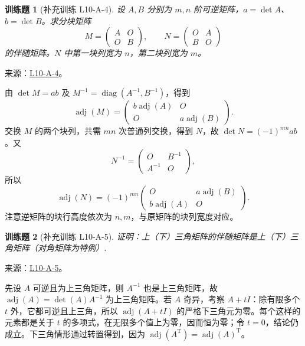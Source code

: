 \documentclass[UTF8,12pt,a4paper,fontset=fandol]{ctexart}
\newtheorem{exercise}{训练题}[section]
\begin{document}
\begin{exercise}[补充训练 L10-A-4]\label{prob:L10-A-4}
设 $A,B$ 分别为 $m,n$ 阶可逆矩阵，$a=\det A$、$b=\det B$。求分块矩阵
\[M=\begin{pmatrix}A&O\\O&B\end{pmatrix},\qquad N=\begin{pmatrix}O&A\\B&O\end{pmatrix}\]
的伴随矩阵。$N$ 中第一块列宽为 $n$，第二块列宽为 $m$。
\end{exercise}
\noindent 来源：\href{https://github.com/yhwu-is/Linear-Algebra-Left-Undone/blob/new/%E8%AE%B2%E4%B9%89/%E4%B8%93%E9%A2%98/10%20%E8%A1%8C%E5%88%97%E5%BC%8F.tex}{L10-A-4}。
\begin{solve}
由 $\det M=ab$ 及 $M^{-1}=\operatorname{diag}(A^{-1},B^{-1})$，得到
\[\operatorname{adj}(M)=\begin{pmatrix}b\operatorname{adj}(A)&O\\O&a\operatorname{adj}(B)\end{pmatrix}.\]
交换 $M$ 的两个块列，共需 $mn$ 次普通列交换，得到 $N$，故 $\det N=(-1)^{mn}ab$。又
\[N^{-1}=\begin{pmatrix}O&B^{-1}\\A^{-1}&O\end{pmatrix},\]
所以
\[\operatorname{adj}(N)=(-1)^{mn}\begin{pmatrix}O&a\operatorname{adj}(B)\\b\operatorname{adj}(A)&O\end{pmatrix}.\]
注意逆矩阵的块行高度依次为 $n,m$，与原矩阵的块列宽度对应。
\end{solve}

\begin{exercise}[补充训练 L10-A-5]\label{prob:L10-A-5}
证明：上（下）三角矩阵的伴随矩阵是上（下）三角矩阵（对角矩阵为特例）.
\end{exercise}
\noindent 来源：\href{https://github.com/yhwu-is/Linear-Algebra-Left-Undone/blob/new/%E8%AE%B2%E4%B9%89/%E4%B8%93%E9%A2%98/10%20%E8%A1%8C%E5%88%97%E5%BC%8F.tex}{L10-A-5}。
\begin{solve}
先设 $A$ 可逆且为上三角矩阵，则 $A^{-1}$ 也是上三角矩阵，故 $\operatorname{adj}(A)=\det(A)A^{-1}$ 为上三角矩阵。若 $A$ 奇异，考察 $A+tI$：除有限多个 $t$ 外，它都可逆且上三角，所以 $\operatorname{adj}(A+tI)$ 的严格下三角元为零。每个这样的元素都是关于 $t$ 的多项式，在无限多个值上为零，因而恒为零；令 $t=0$，结论仍成立。下三角情形通过转置得到，因为 $\operatorname{adj}(A^{\mathrm T})=\operatorname{adj}(A)^{\mathrm T}$。
\end{solve}
\end{document}
